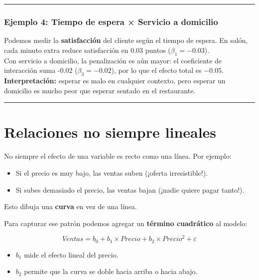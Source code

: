 \documentclass[
  spanish,
  letterpaper,
  DIV=11,
  numbers=noendperiod]{scrreprt}
\providecommand{\tightlist}{%
  \setlength{\itemsep}{0pt}\setlength{\parskip}{0pt}}
\begin{document}
\begin{center}\rule{0.5\linewidth}{0.5pt}\end{center}

\subsubsection{Ejemplo 4: Tiempo de espera × Servicio a
domicilio}\label{ejemplo-4-tiempo-de-espera-servicio-a-domicilio}

Podemos medir la \textbf{satisfacción} del cliente según el tiempo de
espera. En salón, cada minuto extra reduce satisfacción en 0.03 puntos
(\(\beta_1=-0.03\)).\\
Con servicio a domicilio, la penalización es aún mayor: el coeficiente
de interacción suma -0.02 (\(\beta_3=-0.02\)), por lo que el efecto
total es \(-0.05\).\\
\textbf{Interpretación:} esperar es malo en cualquier contexto, pero
esperar un domicilio es mucho peor que esperar sentado en el
restaurante.

\begin{center}\rule{0.5\linewidth}{0.5pt}\end{center}

\section{Relaciones no siempre
lineales}\label{relaciones-no-siempre-lineales-1}

No siempre el efecto de una variable es recto como una línea. Por
ejemplo:

\begin{itemize}
\tightlist
\item
  Si el precio es muy bajo, las ventas suben (¡oferta irresistible!).\\
\item
  Si subes demasiado el precio, las ventas bajan (¡nadie quiere pagar
  tanto!).
\end{itemize}

Esto dibuja una \textbf{curva} en vez de una línea.

Para capturar ese patrón podemos agregar un \textbf{término cuadrático}
al modelo:

\[
Ventas = b_0 + b_1 \times Precio + b_2 \times Precio^2 + \varepsilon
\]

\begin{itemize}
\tightlist
\item
  \(b_1\) mide el efecto lineal del precio.\\
\item
  \(b_2\) permite que la curva se doble hacia arriba o hacia abajo.
\end{itemize}
\end{document}
